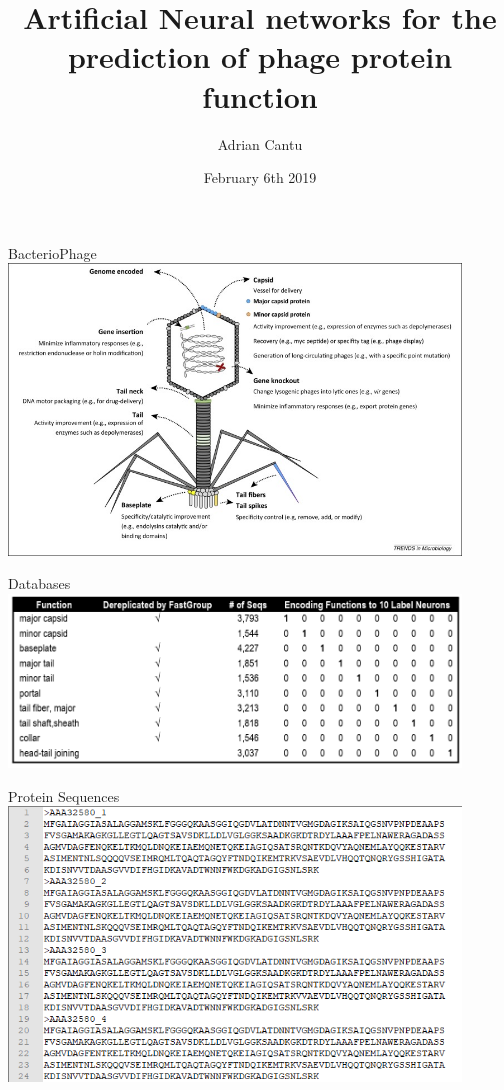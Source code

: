 \documentclass{beamer}
\title[feb 2019 lab meeting]{Artificial Neural networks for the prediction of phage protein function }
\author[A. Cantu]{Adrian Cantu}
\institute[]{
  San Diego State University \\
  Computational Science Research Center}
\date[02/06/2019]{
  February 6th 2019}
\begin{document}
\begin{frame}
  \titlepage
  \centering
\end{frame}



\begin{frame}{BacterioPhage}
\includegraphics[width=0.90\textwidth]{img01}
\end{frame}

\begin{frame}{Databases}
\includegraphics[width=0.90\textwidth]{img02_databases}
\end{frame}

\begin{frame}{Protein Sequences}
\includegraphics[width=0.90\textwidth]{fasta}
\end{frame}
\end{document}

